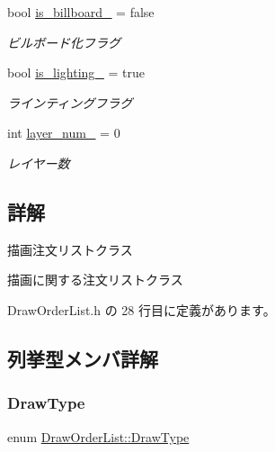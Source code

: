 \begin{DoxyCompactItemize}
bool \mbox{\hyperlink{class_draw_order_list_ae9a77121ff108d8f0ee0c73065f99a75}{is\+\_\+billboard\+\_\+}} = false
\begin{DoxyCompactList}\small\item\em ビルボード化フラグ \end{DoxyCompactList}\item 
bool \mbox{\hyperlink{class_draw_order_list_a26e72a0f47cc2c791eeb87fe6aadeee9}{is\+\_\+lighting\+\_\+}} = true
\begin{DoxyCompactList}\small\item\em ラインティングフラグ \end{DoxyCompactList}\item 
int \mbox{\hyperlink{class_draw_order_list_aff49851688a106fc572abab6e65506b8}{layer\+\_\+num\+\_\+}} = 0
\begin{DoxyCompactList}\small\item\em レイヤー数 \end{DoxyCompactList}\end{DoxyCompactItemize}


\subsection{詳解}
描画注文リストクラス 

描画に関する注文リストクラス 

 Draw\+Order\+List.\+h の 28 行目に定義があります。



\subsection{列挙型メンバ詳解}
\mbox{\label{class_draw_order_list_a6c9b9ceb312c16d399ef355f4f3486bb}} 
\subsubsection{\texorpdfstring{Draw\+Type}{DrawType}}
{\footnotesize\ttfamily enum \mbox{\hyperlink{class_draw_order_list_a6c9b9ceb312c16d399ef355f4f3486bb}{Draw\+Order\+List\+::\+Draw\+Type}}}

